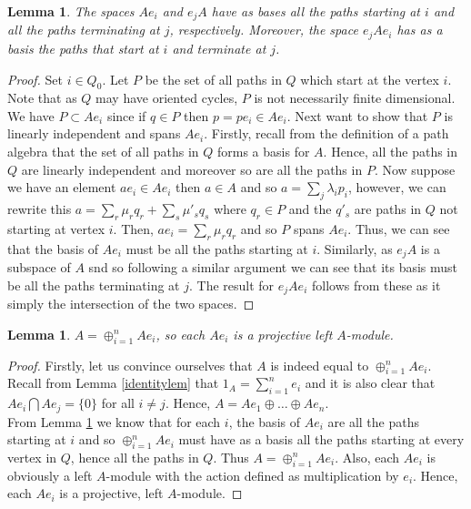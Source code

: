 \documentclass[11.5pt, twoside, a4paper, titlepage]{report}
\theoremstyle{definition}
\theoremstyle{plain}
\newtheorem{lem}[mydef]{Lemma}
\begin{document}
\begin{lem} \label{idempotentspaceslem}
The spaces $Ae_i$ and $e_jA$ have as bases all the paths starting at $i$ and all the paths terminating at $j$, respectively. Moreover, the space $e_jAe_i$ has as a basis the paths that start at $i$ and terminate at $j$.
\end{lem}
\begin{proof}
Set $i\in Q_0$. Let $P$ be the set of all paths in $Q$ which start at the vertex $i$. Note that as $Q$ may have oriented cycles, $P$ is not necessarily finite dimensional. We have $P \subset Ae_i$ since if $q \in P$ then $p=pe_i\in Ae_i$. Next want to show that $P$ is linearly independent and spans $Ae_i$. Firstly, recall from the definition of a path algebra that the set of all paths in $Q$ forms a basis for $A$. Hence, all the paths in $Q$ are linearly independent and moreover so are all the paths in $P$. Now suppose we have an element $ae_i\in Ae_i$ then $a\in A$ and so $a=\sum_{j} \lambda_ip_i$, however, we can rewrite this $a=\sum_r\mu_rq_r + \sum_s \mu'_sq_s$ where $q_r\in P$ and the $q'_s$ are paths in $Q$ not starting at vertex $i$. Then, $ae_i=\sum_r\mu_rq_r$ and so $P$ spans $Ae_i$. Thus, we can see that the basis of $Ae_i$ must be all the paths starting at $i$. Similarly, as $e_jA$ is a subspace of $A$ snd so following a similar argument we can see that its basis must be all the paths terminating at $j$. The result for $e_jAe_i$ follows from these as it simply the intersection of the two spaces.
\end{proof}

\begin{lem}
$A=\oplus^n_{i=1}Ae_i$, so each $Ae_i$ is a projective left $A$-module.
\end{lem}
\begin{proof}
Firstly, let us convince ourselves that $A$ is indeed equal to $\oplus^n_{i=1}Ae_i$. Recall from Lemma \ref{identitylem} that $1_A=\sum^n_{i=1}e_i$ and it is also clear that $Ae_i \bigcap Ae_j=\{0\}$ for all $i\neq j$. Hence, $A=Ae_1\oplus \dots \oplus Ae_n$.\\
From Lemma \ref{idempotentspaceslem} we know that for each $i$, the basis of $Ae_i$ are all the paths starting at $i$ and so $\oplus^n_{i=1}Ae_i$ must have as a basis all the paths starting at every vertex in $Q$, hence all the paths in $Q$. Thus $A=\oplus^n_{i=1}Ae_i$. Also, each $Ae_i$ is obviously a left $A$-module with the action defined as multiplication by $e_i$. Hence, each $Ae_i$ is a projective, left $A$-module.
\end{proof}
\end{document}
